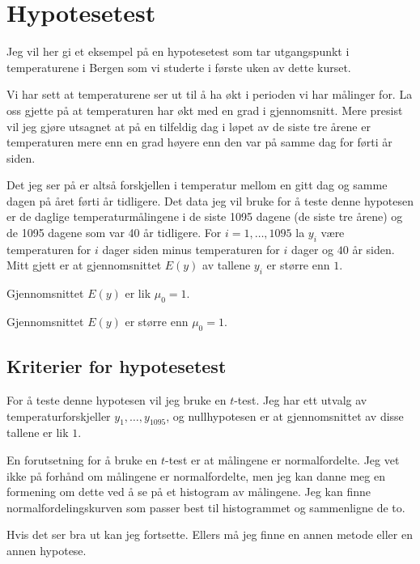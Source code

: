 \section{Hypotesetest}

Jeg vil her gi et eksempel på en hypotesetest som tar utgangspunkt i temperaturene 
i Bergen som vi studerte i første uken av dette kurset.

Vi har sett at temperaturene ser ut til å ha økt i perioden vi har målinger for.
La oss gjette på at temperaturen har økt med en grad i gjennomsnitt.
Mere presist vil jeg gjøre utsagnet at på en tilfeldig dag i løpet av de
siste tre årene er temperaturen mere enn en grad 
høyere enn den var på samme dag for førti år siden.

Det jeg ser på er altså forskjellen i temperatur mellom en gitt dag og samme dagen 
på året førti år tidligere.
Det data jeg vil bruke for å teste denne hypotesen er de daglige temperaturmålingene
i de siste 1095 dagene (de siste tre årene) og de 1095 dagene som var 40 år tidligere.
For $i = 1, \dots, 1095$ la $y_i$ være temperaturen for $i$ dager siden minus temperaturen
for $i$ dager og $40$ år siden.
Mitt gjett er at gjennomsnittet $E(y)$ av tallene $y_i$ er større enn $1$.

\begin{nullhypotese}
  Gjennomsnittet $E(y)$ er lik $\mu_0 = 1$.
\end{nullhypotese}

\begin{alternativhypotese}
  Gjennomsnittet $E(y)$ er større enn $\mu_0 = 1$.
\end{alternativhypotese}

\subsection{Kriterier for hypotesetest}

For å teste denne hypotesen vil jeg bruke en $t$-test.
Jeg har ett utvalg av temperaturforskjeller $y_1, \dots, y_{1095}$, og nullhypotesen
er at gjennomsnittet av disse tallene er lik $1$.

En forutsetning for å bruke en $t$-test er at målingene er normalfordelte.
Jeg vet ikke på forhånd om målingene er normalfordelte, men jeg kan danne meg
en formening om dette ved å se på et histogram av målingene. Jeg kan finne 
normalfordelingskurven som passer best til histogrammet og sammenligne de to.

Hvis det ser bra ut kan jeg fortsette. Ellers må jeg finne en annen metode eller en
annen hypotese.

